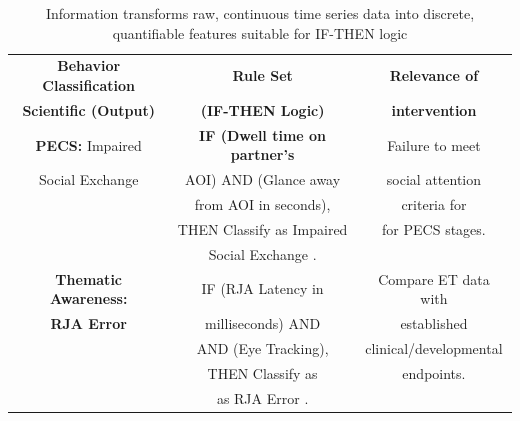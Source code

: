 \begin{table}[h]
    \caption{Information transforms raw, continuous time series data into discrete, quantifiable features suitable for IF-THEN logic}
    \centering
    \begin{tabular}{|c|c|c|}
    \hline
         \textbf{Behavior Classification}& \textbf{Rule Set  } & \textbf{Relevance of}\\ 
         \textbf{Scientific (Output)} & \textbf{(IF-THEN Logic)} &  \textbf{intervention}\\ \hline
         \textbf{PECS:} Impaired  & \textbf{IF (Dwell time on partner's } & Failure to meet  \\ 
         Social Exchange & AOI) AND (Glance away & social attention\\
           & from AOI in seconds),  & criteria for \\
             & THEN Classify as Impaired  & for PECS stages. \\
               & Social Exchange .  &  \\
          \hline
          \textbf{Thematic Awareness:} & IF (RJA Latency in  & Compare ET data with \\
          \textbf{RJA Error} & milliseconds) AND & established  \\
          & AND (Eye Tracking), & clinical/developmental   \\
           & THEN Classify as & endpoints.   \\
            & as RJA Error . &  \\
          \hline
    \end{tabular}
    \label{tba}
\end{table}